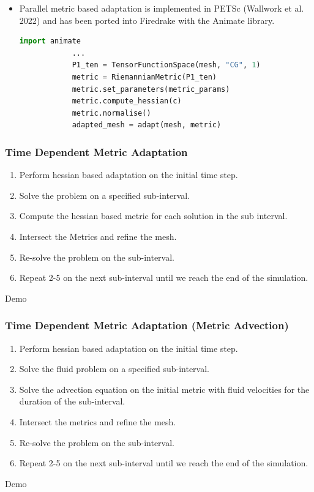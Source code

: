 \documentclass{beamer}
\begin{document}
  \begin{frame}[fragile]
	\begin{itemize}
		\item Parallel metric based adaptation is implemented in PETSc (Wallwork et al. 2022) and has been ported into Firedrake with the Animate library. 
		\vfill
		\begin{lstlisting}[language=Python, basicstyle=\ttfamily\scriptsize]
			import animate
			... 
			P1_ten = TensorFunctionSpace(mesh, "CG", 1)
			metric = RiemannianMetric(P1_ten)
			metric.set_parameters(metric_params)
			metric.compute_hessian(c)
			metric.normalise()
			adapted_mesh = adapt(mesh, metric)
		\end{lstlisting}
	\end{itemize}	
  \end{frame}

  \begin{frame}
	\frametitle{Time Dependent Metric Adaptation}
	\begin{enumerate}
		\item Perform hessian based adaptation on the initial time step.
		\item Solve the problem on a specified sub-interval.
		\item Compute the hessian based metric for each solution in the sub interval. 
		\item Intersect the Metrics and refine the mesh.
		\item Re-solve the problem on the sub-interval.
		\item Repeat 2-5 on the next sub-interval until we reach the end of the simulation. 
	\end{enumerate}
  \end{frame}
  \begin{frame}
	\vfill
	Demo
	\vfill
  \end{frame}

  \begin{frame}
	\frametitle{Time Dependent Metric Adaptation (Metric Advection)}
	\begin{enumerate}
		\item Perform hessian based adaptation on the initial time step.
		\item Solve the fluid problem on a specified sub-interval.
		\item Solve the advection equation on the initial metric with fluid velocities for the duration of the sub-interval. 
		\item Intersect the metrics and refine the mesh.
		\item Re-solve the problem on the sub-interval.
		\item Repeat 2-5 on the next sub-interval until we reach the end of the simulation. 
	\end{enumerate}
  \end{frame}
  \begin{frame}
	\vfill
	Demo
	\vfill
  \end{frame}



  





\end{document}
